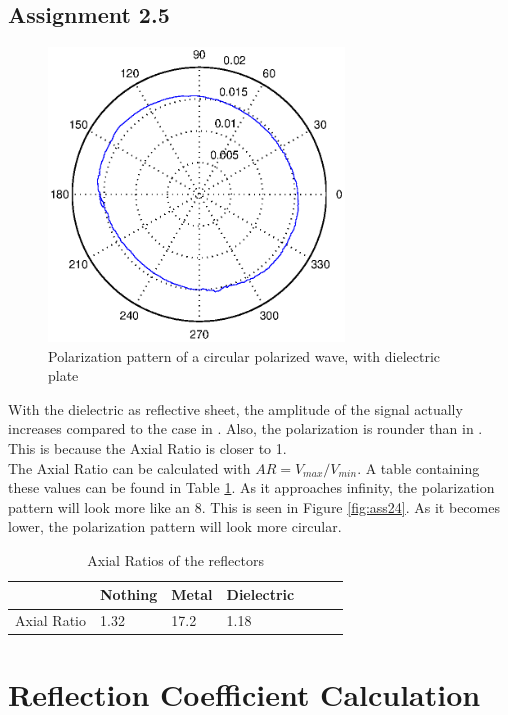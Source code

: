 \documentclass{article}
\begin{document}
\subsection{Assignment 2.5}
\begin{figure}[H]
\centering
\includegraphics[width=0.7\textwidth]{Plotjes/ass25.eps}
\caption{Polarization pattern of a circular polarized wave, with dielectric plate}
\end{figure}
With the dielectric as reflective sheet, the amplitude of the signal actually increases compared to the case in . 
Also, the polarization is rounder than in . This is because the Axial Ratio is closer to 1. \\
The Axial Ratio can be calculated with $AR = V_{max}/V_{min}$. A table containing these values can be found in Table \ref{tab:AR}. As it approaches infinity, the polarization pattern will look more like an 8. This is seen in Figure \ref{fig:ass24}. As it becomes lower, the polarization pattern will look more circular. 

		\begin{table}[H]
			\centering
			\begin{tabular}{l|llllll}
				                       & Nothing        & Metal         & Dielectric & \\ \hline
				Axial Ratio & 1.32        & 17.2            & 1.18\\
			\end{tabular}
			\caption{Axial Ratios of the reflectors}
			\label{tab:AR}
		\end{table}

\section{Reflection Coefficient Calculation}
\end{document}
